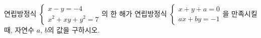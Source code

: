 연립방정식 $\begin{cases} x-y=-4 \\ x^2+xy+y^2=7 \end{cases}$의 한 해가 연립방정식 $\begin{cases} x+y+a=0 \\ ax+by=-1 \end{cases}$을 만족시킬 때, 자연수 $a$, $b$의 값을 구하시오.
